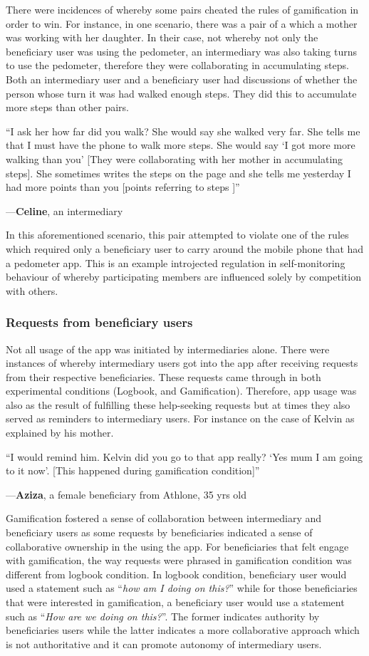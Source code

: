 \documentclass{sig-alternate}
\newenvironment{myquote}
               {\list{}{\rightmargin   \leftmargin
                        \parsep        0in }%
                \item\relax}
               {\endlist}
\newcommand{\userquote}[2]{\begin{samepage}\begin{myquote} 
     \em{\small{#2\begin{flushright}---#1\end{flushright}}}
   \end{myquote}\end{samepage}}
\begin{document}
There were incidences of whereby some pairs cheated the rules of gamification in order to win. For instance, in one scenario, there was a pair of a which a mother was working with her daughter. In their case, not whereby not only the beneficiary user was using the pedometer, an intermediary was also taking turns to use the pedometer, therefore they were collaborating in accumulating steps. Both an intermediary user and a beneficiary user had discussions of whether the person whose turn it was had walked enough steps. They did this to accumulate more steps than other pairs.

\userquote{\textbf{Celine}, an intermediary} {``I ask her how far did you walk?  She would say she walked very far. She tells me that I must have the phone to walk more steps. She would say `I got more more walking than you' [They were collaborating with her mother in accumulating steps]. She sometimes writes the steps on the page and she tells me yesterday I had more points than you [points referring to steps ]''}   

In this aforementioned scenario, this pair attempted to violate one of the rules which required only a beneficiary user to carry around the mobile phone that had a pedometer app. This is an example introjected regulation in self-monitoring behaviour of whereby participating members are influenced solely by competition with others.
\subsubsection*{\textbf{Requests from beneficiary users}}
Not all usage of the app was initiated by intermediaries alone. There were instances of whereby intermediary users got into the app after receiving requests from their respective beneficiaries. These requests came through in both experimental conditions (Logbook, and Gamification). Therefore, app usage was also as the result of fulfilling these help-seeking requests but at times they also served as reminders to intermediary users. For instance on the case of Kelvin as explained by his mother.

\userquote{\textbf{Aziza}, a female beneficiary from Athlone, 35 yrs old} {``I would remind him. Kelvin did you go to that app really? `Yes mum I am going to it now'. [This happened during gamification condition]''} 

Gamification fostered a sense of collaboration between intermediary  and beneficiary users as some requests by beneficiaries indicated a sense of collaborative ownership in the using the app. For beneficiaries that felt engage with gamification, the way requests were phrased in gamification condition was different from logbook condition. In logbook condition, beneficiary user would used a statement such as ``\emph{how am I doing on this?}'' while for those beneficiaries that were interested in gamification, a beneficiary user would use a statement such as ``\emph{How are we doing on this?}''. The former indicates authority by beneficiaries users while the latter indicates a more collaborative approach which is not authoritative and it can promote autonomy of intermediary users.
\end{document}
